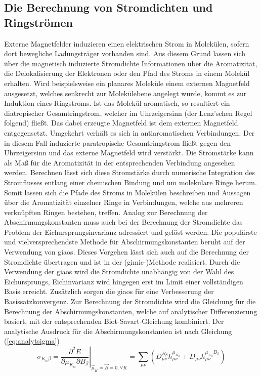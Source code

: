 \newpage
\subsection{Die Berechnung von Stromdichten und Ringströmen}
Externe Magnetfelder induzieren einen elektrischen Strom in Molekülen, sofern dort bewegliche Ladungsträger vorhanden sind. Aus diesem Grund lassen sich über die magnetisch induzierte Stromdichte Informationen über die Aromatizität, die Delokalisierung der Elektronen oder den Pfad des Stroms in einem Molekül erhalten.\supercite{fliegl2011gauge} Wird beispielsweise ein planares Moleküle einem externen Magnetfeld ausgesetzt, welches senkrecht zur Molekülebene angelegt wurde, kommt es zur Induktion eines Ringstroms. Ist das Molekül aromatisch, so resultiert ein diatropischer Gesamtringstrom, welcher im Uhrzeigersinn (der Lenz'schen Regel folgend) fließt. Das dabei erzeugte Magnetfeld ist dem externen Magnetfeld entgegensetzt. Umgekehrt verhält es sich in antiaromatischen Verbindungen. Der in diesem Fall induzierte paratropische Gesamtringstrom fließt gegen den Uhrzeigersinn und das externe Magnetfeld wird verstärkt. Die Stromstärke kann als Maß für die Aromatizität in der entsprechenden Verbindung angesehen werden. Berechnen lässt sich diese Stromstärke durch numerische Integration des Stromflusses entlang einer chemischen Bindung und um molekulare Ringe herum. Somit lassen sich die Pfade des Stroms in Molekülen beschreiben und Aussagen über die Aromatizität einzelner Ringe in Verbindungen, welche aus mehreren verknüpften Ringen bestehen, treffen. Analog zur Berechnung der Abschirmungskonstanten muss auch bei der Berechnung der Stromdichte das Problem der Eichursprungsinvarianz adressiert und gelöst werden. Die populärste und vielversprechendste Methode für Abschirmungskonstanten beruht auf der Verwendung von \acp{giao}. Dieses Vorgehen lässt sich auch auf die Berechnung der Stromdichte übertragen und ist in der \mbox{(\acs{gimic}-)}Methode\supercite{juselius2004calculation,taubert2011calculation,fliegl2011gauge,sundholm2016calculations} realisiert. Durch die Verwendung der \acp{giao} wird die Stromdichte unabhängig von der Wahl des Eichursprungs, Eichinvarianz wird hingegen erst im Limit einer vollständigen Basis erreicht.\supercite{juselius2004calculation} Zusätzlich sorgen die \acp{giao} für eine Verbesserung der Basissatzkonvergenz.\supercite{fliegl2011gauge} Zur Berechnung der Stromdichte wird die Gleichung für die Berechnung der Abschirmungskonstanten, welche auf analytischer Differenzierung basiert, mit der entsprechenden Biot-Savart-Gleichung kombiniert.\supercite{lazzeretti2000ring} Der analytische Ausdruck für die Abschirmungskonstanten ist nach Gleichung (\ref{eq:analytsigma}) 
    \begin{equation}\label{eq:sigmaana}
    \sigma_{K_\alpha\beta}=\left.\frac{\partial^2 E}{\partial \mu_{K_\alpha}\partial B_\beta}\right|_{\vec{\mu}_K=\vec{B}=0,\forall K}=\sum_{\mu\nu}\left(D_{\mu\nu}^{B_\beta}h_{\mu\nu}^{\mu_{K_\alpha}}+D_{\mu\nu}h_{\mu\nu}^{\mu_{K_\alpha}B_\beta}\right) 
    \end{equation}
\vfill 
\newpage
    
